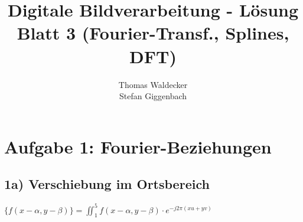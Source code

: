 \documentclass[a4paper,10pt]{scrartcl}
\title{Digitale Bildverarbeitung - Lösung Blatt 3 (Fourier-Transf., Splines, DFT)}
\author{Thomas Waldecker\\
	Stefan Giggenbach}
\begin{document}
\maketitle

\section{Aufgabe 1: Fourier-Beziehungen}
\subsection{1a) Verschiebung im Ortsbereich}

$\{f(x-\alpha,y-\beta)\}=\iint_{1}^{5}{f(x-\alpha,y-\beta)\cdot e^{-j2\pi(xu+yv)}}$
\end{document}
